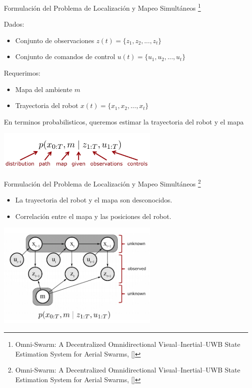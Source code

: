 \documentclass[
  24pt, %
  aspectratio=169, %
]{beamer}
\begin{document}
\begin{frame}{Formulación del Problema de Localización y Mapeo Simultáneos \footnote{Omni-Swarm: A Decentralized Omnidirectional Visual–Inertial–UWB State Estimation System for Aerial Swarms, [\cite{OMNI2022}]}}

  Dados:
  \begin{itemize}
  \item Conjunto de observaciones $z(t) = \{z_1,z_2,...,z_t\}$
  \item Conjunto de comandos de control $u(t) = \{u_1,u_2,...,u_t\}$
  \end{itemize}
  \bigskip %
  Requerimos:
  \begin{itemize}
  \item Mapa del ambiente $m$
  \item Trayectoria del robot $x(t) = \{x_1,x_2,...,x_t\}$
  \end{itemize}
  \bigskip %
  
  En terminos probabilisticos, queremos estimar la trayectoria del robot y el mapa

  \centering
  \includegraphics[width=8cm]{slam1}
  
\end{frame}

\begin{frame}{Formulación del Problema de Localización y Mapeo Simultáneos \footnote{Omni-Swarm: A Decentralized Omnidirectional Visual–Inertial–UWB State Estimation System for Aerial Swarms, [\cite{OMNI2022}]}}

  \begin{itemize}
  \item La trayectoria del robot y el mapa son desconocidos.
  \item Correlación entre el mapa y las posiciones del robot. 
  \end{itemize}

  \centering

  \includegraphics[width=8cm]{slam2}

\end{frame}
\end{document}
